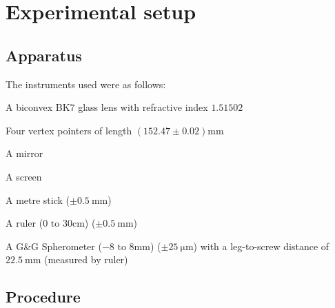 \chapter{Experimental setup}


\section{Apparatus}
The instruments used were as follows:

\begin{lrapparatus}
    \item A biconvex BK7 glass lens with refractive index $1.51502$
    \item Four vertex pointers of length $(152.47 \pm 0.02) \unit{\milli\metre}$
    \item A mirror
    \item A screen
    \item A metre stick ($\pm \qty{0.5}{\milli\metre}$)
    \item A ruler ($0 \text{ to } 30\unit{\centi\metre}$) ($\pm \qty{0.5}{\milli\metre}$)
    \item A G\&G Spherometer ($-8 \text{ to } 8 \unit{\milli\metre}$) ($\pm \qty{25}{\micro\metre}$) with a leg-to-screw distance of $\qty{22.5}{\milli\metre}$ (measured by ruler)
\end{lrapparatus}


\section{Procedure}